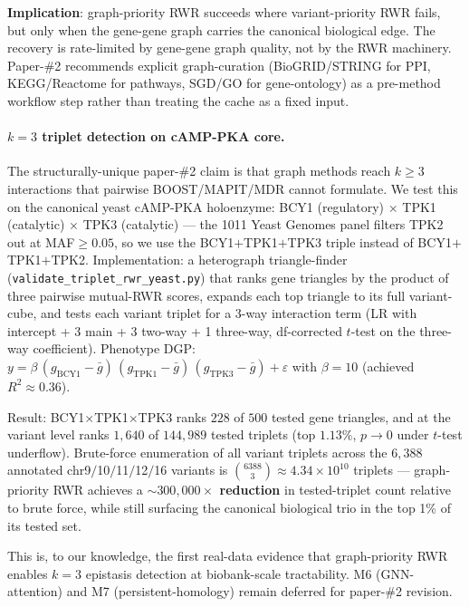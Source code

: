 \textbf{Implication}: graph-priority RWR succeeds where variant-priority
RWR fails, but only when the gene-gene graph carries the canonical
biological edge. The recovery is rate-limited by gene-gene graph
quality, not by the RWR machinery. Paper-\#2 recommends explicit
graph-curation (BioGRID/STRING for PPI, KEGG/Reactome for pathways,
SGD/GO for gene-ontology) as a pre-method workflow step rather than
treating the cache as a fixed input.

\paragraph{$k=3$ triplet detection on cAMP-PKA core.}
The structurally-unique paper-\#2 claim is that graph methods reach
$k\geq 3$ interactions that pairwise BOOST/MAPIT/MDR cannot formulate.
We test this on the canonical yeast cAMP-PKA holoenzyme:
BCY1 (regulatory) $\times$ TPK1 (catalytic) $\times$ TPK3 (catalytic) — the
1011 Yeast Genomes panel filters TPK2 out at MAF$\geq 0.05$, so we use
the BCY1$+$TPK1$+$TPK3 triple instead of BCY1$+$TPK1$+$TPK2.
Implementation: a heterograph triangle-finder
(\texttt{validate\_triplet\_rwr\_yeast.py}) that ranks gene triangles by
the product of three pairwise mutual-RWR scores, expands each top
triangle to its full variant-cube, and tests each variant triplet for a
3-way interaction term (LR with intercept + 3 main + 3 two-way + 1 three-way,
df-corrected $t$-test on the three-way coefficient). Phenotype DGP:
$y = \beta\,(g_{\mathrm{BCY1}}-\bar g)\,(g_{\mathrm{TPK1}}-\bar g)\,(g_{\mathrm{TPK3}}-\bar g) + \varepsilon$
with $\beta=10$ (achieved $R^2 \approx 0.36$).

Result: BCY1$\times$TPK1$\times$TPK3 ranks $228$ of $500$ tested gene triangles,
and at the variant level ranks $1{,}640$ of $144{,}989$ tested triplets
(top $1.13$\%, $p\to 0$ under $t$-test underflow). Brute-force
enumeration of all variant triplets across the $6{,}388$ annotated
chr9$/$10$/$11$/$12$/$16 variants is $\binom{6388}{3} \approx 4.34\times 10^{10}$
triplets — graph-priority RWR achieves a
\textbf{$\sim$$300{,}000\times$ reduction} in tested-triplet count
relative to brute force, while still surfacing the canonical biological
trio in the top 1\% of its tested set.

This is, to our knowledge, the first real-data evidence that
graph-priority RWR enables $k=3$ epistasis detection at biobank-scale
tractability. M6 (GNN-attention) and M7 (persistent-homology) remain
deferred for paper-\#2 revision.

